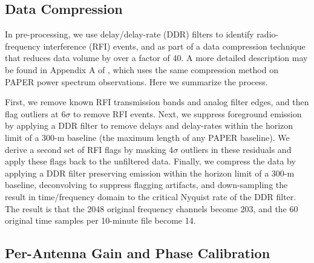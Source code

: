 \documentclass[preprint]{aastex}
\begin{document}
\subsection{Data Compression}

In pre-processing, we use delay/delay-rate (DDR) filters
\citep{Parsons:2009p7859} to identify radio-frequency interference (RFI)
events, and as part of a data compression technique that reduces data volume by
over a factor of 40.  A more detailed description may be found in Appendix A of
\cite{Parsons2013b}, which uses the same compression method on PAPER power
spectrum observations. Here we summarize the process.

First, we remove known RFI transmission bands and analog filter edges, and then
flag outliers at 6$\sigma$ to remove RFI events.  Next, we suppress foreground
emission by applying a DDR filter to remove delays and delay-rates within the
horizon limit of a 300-m baseline (the maximum length of any PAPER baseline).
We derive a second set of RFI flags by masking 4$\sigma$ outliers in these
residuals and apply these flags back to the unfiltered data.  Finally, we
compress the data by applying a DDR filter preserving emission within the
horizon limit of a 300-m baseline, deconvolving to suppress flagging artifacts,
and down-sampling the result in time/frequency domain to the critical Nyquist
rate of the DDR filter.  The result is that the 2048 original frequency
channels become 203, and the 60 original time samples per 10-minute file become
14. 



\subsection{Per-Antenna Gain and Phase Calibration}

\end{document}
